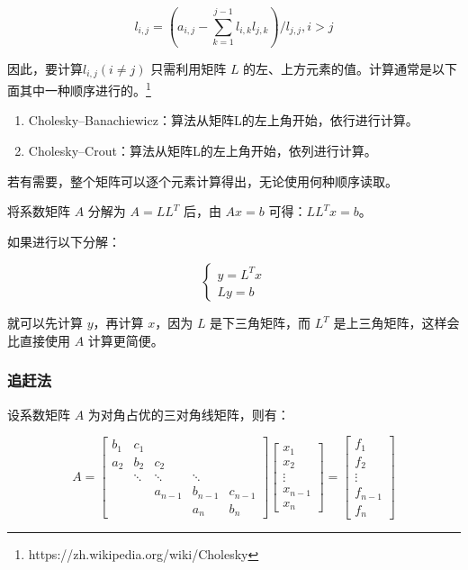 \[
    l_{i,j} = (a_{i,j} - \sum_{k=1}^{j-1}l_{i,k}l_{j,k}) / l_{j,j},  i > j
\]

因此，要计算${l}_{i,j}(i\neq j)$ 只需利用矩阵 $L$ 的左、上方元素的值。计算通常是以下面其中一种顺序进行的。\footnote{https://zh.wikipedia.org/wiki/Cholesky}

\begin{enumerate}
    \item Cholesky–Banachiewicz：算法从矩阵L的左上角开始，依行进行计算。
    \item Cholesky–Crout：算法从矩阵L的左上角开始，依列进行计算。
\end{enumerate}

若有需要，整个矩阵可以逐个元素计算得出，无论使用何种顺序读取。

将系数矩阵 \(A\) 分解为 \(A = L L^T\) 后，由 \(Ax = b\)
可得：\(LL^Tx = b\)。

如果进行以下分解：

\[
    \left\{\begin{matrix}
        y = L^Tx \\
        Ly = b
    \end{matrix}\right.
\]


就可以先计算 \(y\)，再计算 \(x\)，因为 \(L\) 是下三角矩阵，而 \(L^T\)
是上三角矩阵，这样会比直接使用 \(A\) 计算更简便。

\subsubsection{追赶法}

设系数矩阵 $A$ 为对角占优的三对角线矩阵，则有：

\begin{equation}
    A =
    \begin{bmatrix}
        b_1 & c_1                                  \\
        a_2 & b_2    & c_2                         \\
            & \ddots & \ddots  & \ddots            \\
            &        & a_{n-1} & b_{n-1} & c_{n-1} \\
            &        &         & a_n     & b_n
    \end{bmatrix}
    \begin{bmatrix}
        x_1     \\
        x_2     \\
        \vdots  \\
        x_{n-1} \\
        x_n
    \end{bmatrix}
    =
    \begin{bmatrix}
        f_1     \\
        f_2     \\
        \vdots  \\
        f_{n-1} \\
        f_n
    \end{bmatrix}
    \label{three}
\end{equation}

